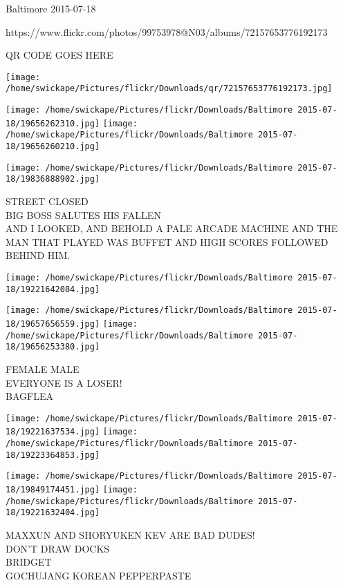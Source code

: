 \documentclass[10pt,letterpaper]{article}
\begin{document}
Baltimore 2015-07-18

https://www.flickr.com/photos/99753978@N03/albums/72157653776192173

QR CODE GOES HERE

\texttt{[image: /home/swickape/Pictures/flickr/Downloads/qr/72157653776192173.jpg]}
\pagebreak

\texttt{[image: /home/swickape/Pictures/flickr/Downloads/Baltimore 2015-07-18/19656262310.jpg]}
\texttt{[image: /home/swickape/Pictures/flickr/Downloads/Baltimore 2015-07-18/19656260210.jpg]}

\vspace{0.25in}
\texttt{[image: /home/swickape/Pictures/flickr/Downloads/Baltimore 2015-07-18/19836888902.jpg]}

STREET CLOSED\\
BIG BOSS SALUTES HIS FALLEN\\
AND I LOOKED, AND BEHOLD A PALE ARCADE MACHINE AND THE MAN THAT PLAYED WAS BUFFET AND HIGH SCORES FOLLOWED BEHIND HIM.\\
\pagebreak

\texttt{[image: /home/swickape/Pictures/flickr/Downloads/Baltimore 2015-07-18/19221642084.jpg]}

\vspace{0.25in}
\texttt{[image: /home/swickape/Pictures/flickr/Downloads/Baltimore 2015-07-18/19657656559.jpg]}
\texttt{[image: /home/swickape/Pictures/flickr/Downloads/Baltimore 2015-07-18/19656253380.jpg]}

FEMALE MALE\\
EVERYONE IS A LOSER!\\
BAGFLEA\\
\pagebreak

\texttt{[image: /home/swickape/Pictures/flickr/Downloads/Baltimore 2015-07-18/19221637534.jpg]}
\texttt{[image: /home/swickape/Pictures/flickr/Downloads/Baltimore 2015-07-18/19223364853.jpg]}

\texttt{[image: /home/swickape/Pictures/flickr/Downloads/Baltimore 2015-07-18/19849174451.jpg]}
\texttt{[image: /home/swickape/Pictures/flickr/Downloads/Baltimore 2015-07-18/19221632404.jpg]}

MAXXUN AND SHORYUKEN KEV ARE BAD DUDES!\\
DON'T DRAW DOCKS\\
BRIDGET\\
GOCHUJANG KOREAN PEPPERPASTE\\
\pagebreak
\end{document}
